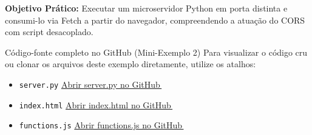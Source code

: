 \begin{boxAtividade}
\textbf{Objetivo Prático:} Executar um microservidor Python em porta distinta e consumi-lo via Fetch a partir do navegador, compreendendo a atuação do CORS com script desacoplado.
\end{boxAtividade}

\begin{repositorio}{Código-fonte completo no GitHub (Mini-Exemplo 2)}
Para visualizar o código cru ou clonar os arquivos deste exemplo diretamente, utilize os atalhos:
\begin{itemize}[nosep]
  \item \texttt{server.py} \seta \href{https://github.com/chameoandre/CST-Sistemas-para-internet-programacao-para-internet-2/blob/main/roteiro-5/mini-exemplos/02-micro-flask-cors/server.py}{Abrir server.py no GitHub\,{\scriptsize\faExternalLinkAlt}}
  \item \texttt{index.html} \seta \href{https://github.com/chameoandre/CST-Sistemas-para-internet-programacao-para-internet-2/blob/main/roteiro-5/mini-exemplos/02-micro-flask-cors/index.html}{Abrir index.html no GitHub\,{\scriptsize\faExternalLinkAlt}}
  \item \texttt{functions.js} \seta \href{https://github.com/chameoandre/CST-Sistemas-para-internet-programacao-para-internet-2/blob/main/roteiro-5/mini-exemplos/02-micro-flask-cors/functions.js}{Abrir functions.js no GitHub\,{\scriptsize\faExternalLinkAlt}}
\end{itemize}
\end{repositorio}

